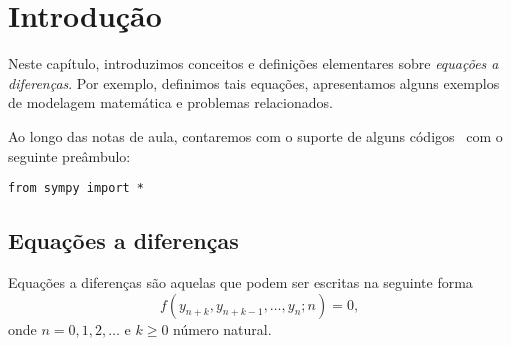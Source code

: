 
\chapter{Introdução}\label{cap_intro}

Neste capítulo, introduzimos conceitos e definições elementares sobre \emph{equações a diferenças}. Por exemplo, definimos tais equações, apresentamos alguns exemplos de modelagem matemática e problemas relacionados.

\ifispython
\begin{obs}\label{obs:python}
Ao longo das notas de aula, contaremos com o suporte de alguns códigos \python\, com o seguinte preâmbulo:
\begin{verbatim}
from sympy import *
\end{verbatim}
\end{obs}
\fi


\section{Equações a diferenças}\label{cap_intro_sec_ead}

Equações a diferenças são aquelas que podem ser escritas na seguinte forma
\begin{equation}\label{eq:intro_ead}
  f(y_{n+k},y_{n+k-1},\dotsc,y_n;n) = 0,
\end{equation}
onde $n=0, 1, 2, \ldots$ e $k\geq 0$ número natural.

